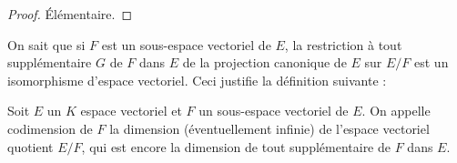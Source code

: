 \begin{proof}
Élémentaire.
\end{proof}

\begin{rem}
On sait que si $F$ est un sous-espace vectoriel de $E$, la restriction à tout supplémentaire $G$ de $F$ dans $E$ de la projection canonique de $E$ sur $E/F$ est un isomorphisme d'espace vectoriel. Ceci justifie la définition suivante :
\end{rem}

\begin{de}
Soit $E$ un $K$ espace vectoriel et $F$ un sous-espace vectoriel de $E$. On appelle codimension de $F$ la dimension (éventuellement infinie) de l'espace vectoriel quotient $E/F$, qui est encore la dimension de tout supplémentaire de $F$ dans $E$.
\end{de}